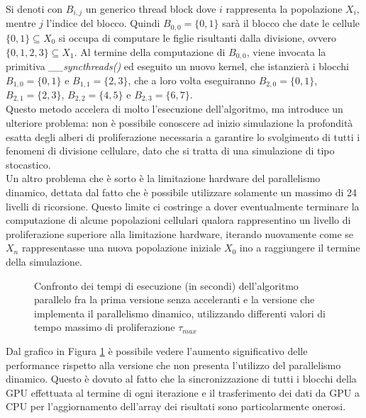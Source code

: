 Si denoti con $B_{i,j}$ un generico thread block dove
$i$ rappresenta la popolazione $X_{i}$, mentre $j$ l'indice del blocco.
Quindi $B_{0,0} = \{0, 1\}$ sarà il blocco che date le
cellule $\{0, 1\} \subseteq X_{0}$ si occupa di
computare le figlie risultanti dalla divisione, ovvero
$\{0, 1, 2, 3\} \subseteq X_{1}$.
Al termine della computazione di $B_{0,0}$, viene invocata la primitiva 
\textit{\_\_syncthreads()} ed eseguito un nuovo kernel, che istanzierà
i blocchi $B_{1,0} = \{0, 1\}$ e $B_{1,1} = \{2, 3\}$, che a loro volta
eseguiranno $B_{2,0} = \{0, 1\}$, $B_{2,1} = \{2, 3\}$,
$B_{2,2} = \{4, 5\}$ e $B_{2,3} = \{6, 7\}$.
\\
Questo metodo accelera di molto l'esecuzione dell'algoritmo, ma introduce un
ulteriore problema: non è possibile conoscere ad inizio simulazione la
profondità esatta degli alberi di proliferazione necessaria a garantire lo
svolgimento di tutti i fenomeni di divisione cellulare, dato che si tratta di
una simulazione di tipo stocastico.
\\
Un altro problema che è sorto è la limitazione hardware del parallelismo
dinamico, dettata dal fatto che è possibile utilizzare solamente un massimo
di 24 livelli di ricorsione. Questo limite ci costringe a dover
eventualmente terminare la computazione di alcune popolazioni cellulari qualora
rappresentino un livello di proliferazione superiore alla limitazione hardware,
iterando nuovamente come se $X_{n}$ rappresentasse una nuova
popolazione iniziale $X_{0}$ ino a raggiungere il termine della simulazione.

\begin{figure}[t]
    \centering
    \caption{Confronto dei tempi di esecuzione (in secondi) dell'algoritmo
    parallelo fra la prima versione senza acceleranti e la versione
    che implementa il parallelismo dinamico, utilizzando differenti valori di
    tempo massimo di proliferazione $\tau_{max}$}
    \label{chart:original-dynamic}
\end{figure}
Dal grafico in Figura \ref{chart:original-dynamic} è possibile vedere
l'aumento significativo delle
performance rispetto alla versione che non presenta l'utilizzo del
parallelismo dinamico. Questo è dovuto al fatto che la
sincronizzazione di tutti i blocchi della GPU effettuata al termine di ogni
iterazione e il trasferimento
dei dati da GPU a CPU per l'aggiornamento dell'array dei risultati sono
particolarmente onerosi.

